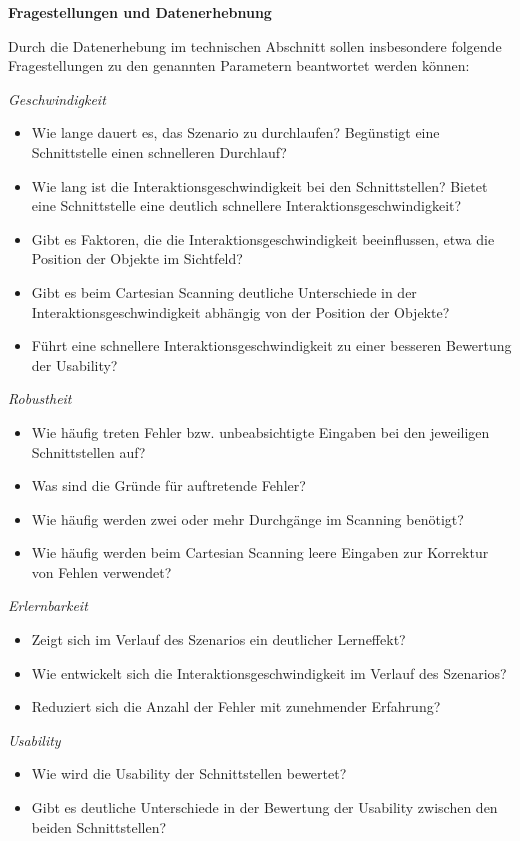 \textbf{Fragestellungen und Datenerhebnung}

Durch die Datenerhebung im technischen Abschnitt sollen insbesondere folgende Fragestellungen zu den genannten Parametern beantwortet werden können:

\textit{Geschwindigkeit} 
    \begin{itemize}
        \item Wie lange dauert es, das Szenario zu durchlaufen? Begünstigt eine Schnittstelle einen schnelleren Durchlauf?
        \item Wie lang ist die Interaktionsgeschwindigkeit bei den Schnittstellen? Bietet eine Schnittstelle eine deutlich schnellere Interaktionsgeschwindigkeit?
        \item Gibt es Faktoren, die die Interaktionsgeschwindigkeit beeinflussen, etwa die Position der Objekte im Sichtfeld?
        \item Gibt es beim Cartesian Scanning deutliche Unterschiede in der Interaktionsgeschwindigkeit abhängig von der Position der Objekte?
        \item Führt eine schnellere Interaktionsgeschwindigkeit zu einer besseren Bewertung der Usability? 
    \end{itemize}
\textit{Robustheit}
    \begin{itemize}
        \item  Wie häufig treten Fehler bzw. unbeabsichtigte Eingaben bei den jeweiligen Schnittstellen auf? 
        \item Was sind die Gründe für auftretende Fehler?
        \item Wie häufig werden zwei oder mehr Durchgänge im Scanning benötigt?
        \item Wie häufig werden beim Cartesian Scanning leere Eingaben zur Korrektur von Fehlen verwendet? 
    \end{itemize}
\textit{Erlernbarkeit}
    \begin{itemize}
        \item Zeigt sich im Verlauf des Szenarios ein deutlicher Lerneffekt? 
        \item Wie entwickelt sich die Interaktionsgeschwindigkeit im Verlauf des Szenarios? 
        \item Reduziert sich die Anzahl der Fehler mit zunehmender Erfahrung?
    \end{itemize}
\textit{Usability}
    \begin{itemize}
    \item Wie wird die Usability der Schnittstellen bewertet?
    \item Gibt es deutliche Unterschiede in der Bewertung der Usability zwischen den beiden Schnittstellen? 
    \end{itemize}

